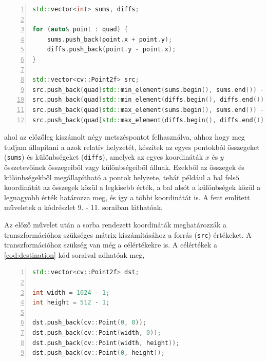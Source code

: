 \vspace{2mm}
\hspace{-10mm}
\begin{minipage}{\linewidth}
\begin{lstlisting}[language=C++, numbers=left, caption={Átrendező algoritmus.}, label={cod:atrendezes}]
std::vector<int> sums, diffs;

for (auto& point : quad) {
    sums.push_back(point.x + point.y);
    diffs.push_back(point.y - point.x);
}

std::vector<cv::Point2f> src;
src.push_back(quad[std::min_element(sums.begin(), sums.end()) - sums.begin()]);
src.push_back(quad[std::min_element(diffs.begin(), diffs.end()) - diffs.begin()]);
src.push_back(quad[std::max_element(sums.begin(), sums.end()) - sums.begin()]);
src.push_back(quad[std::max_element(diffs.begin(), diffs.end()) - diffs.begin()]);
\end{lstlisting}
\end{minipage}

\par ahol az előzőleg kiszámolt négy metszéspontot felhasználva, ahhoz hogy meg tudjam állapítani a azok relatív helyzetét, készítek az egyes pontokból összegeket (\lstinline{sums}) és különbségeket (\lstinline{diffs}), amelyek az egyes koordináták $x$ és $y$ összetevőinek összegeiből vagy különbségeiből állnak. Ezekből az összegek és különbségekből megállapítható a pontok helyzete, tehát például a bal felső koordinátát az összegek közül a legkisebb érték, a bal alsót a különbségek közül a legnagyobb érték határozza meg, és így a többi koordinátát is. A fent említett műveletek a kódrészlet 9. - 11. soraiban láthatóak.
\par Az előző művelet után a sorba rendezett koordináták meghatározzák a transzformációhoz szükséges mátrix kiszámításához a forrás (\lstinline{src}) értékeket. A transzformációhoz szükség van még a célértékekre is.
\newline A célértékek a \ref{cod:destination} kód soraival adhatóak meg,

\vspace{2mm}
\hspace{-10mm}
\begin{minipage}{\linewidth}
\begin{lstlisting}[language=C++, numbers=left, caption={A kimeneti értékek megadása.}, label={cod:destination}]
std::vector<cv::Point2f> dst;

int width = 1024 - 1;
int height = 512 - 1;

dst.push_back(cv::Point(0, 0));
dst.push_back(cv::Point(width, 0));
dst.push_back(cv::Point(width, height));
dst.push_back(cv::Point(0, height));
\end{lstlisting}
\end{minipage}

